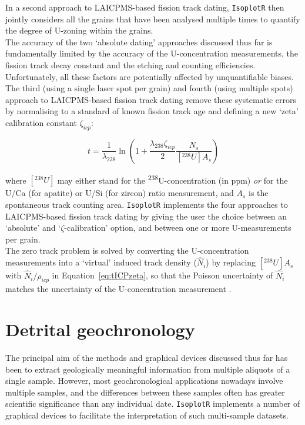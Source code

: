 \documentclass{article}
\begin{document}
In a second approach to LAICPMS-based fission track dating,
\texttt{IsoplotR} then jointly considers all the grains that have been
analysed multiple times to quantify the degree of U-zoning within the
grains.\\

The accuracy of the two `absolute dating' approaches discussed thus
far is fundamentally limited by the accuracy of the U-concentration
measurements, the fission track decay constant and the etching and
counting efficiencies.  Unfortunately, all these factors are
potentially affected by unquantifiable biases.\\

The third (using a single laser spot per grain) and fourth (using
multiple spots) approach to LAICPMS-based fission track dating remove
these systematic errors by normalising to a standard of known fission
track age and defining a new `zeta' calibration constant
$\zeta_{icp}$:

\begin{equation}
  t = \frac{1}{\lambda_{238}} \ln\left( 1 +
  \frac{\lambda_{238}\zeta_{icp}}{2} \frac{N_s}{[{}^{238}U] A_s} \right)
  \label{eq:tICPzeta}
\end{equation}

\noindent where $[{}^{238}U]$ may either stand for the
\textsuperscript{238}U-concentration (in ppm) \emph{or} for the U/Ca
(for apatite) or U/Si (for zircon) ratio measurement, and $A_s$ is the
spontaneous track counting area.  \texttt{IsoplotR} implements the
four approaches to LAICPMS-based fission track dating by giving the
user the choice between an `absolute' and `$\zeta$-calibration'
option, and between one or more U-measurements per grain.\\

The zero track problem is solved by converting the U-concentration
measurements into a `virtual' induced track density ($\hat{N}_i$) by
replacing $[{}^{238}U] A_s$ with $\hat{N}_i/\rho_{icp}$ in
Equation~\ref{eq:tICPzeta}, so that the Poisson uncertainty of
$\hat{N}_i$ matches the uncertainty of the U-concentration measurement
\citep{vermeesch2017}.

\section{Detrital geochronology}
\label{sec:detritals}

The principal aim of the methods and graphical devices discussed thus
far has been to extract geologically meaningful information from
multiple aliquots of a single sample. However, most geochronological
applications nowadays involve multiple samples, and the differences
between these samples often has greater scientific significance than
any individual date.  \texttt{IsoplotR} implements a number of
graphical devices to facilitate the interpretation of such
multi-sample datasets.\\
\end{document}
